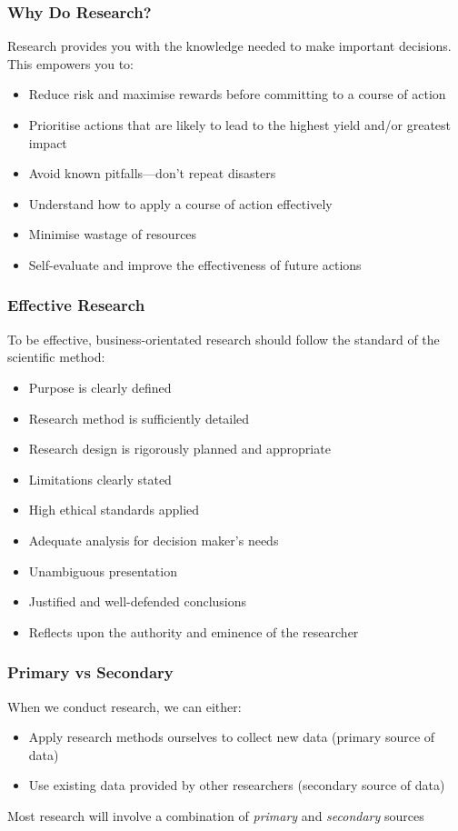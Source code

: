 \begin{frame}
	\frametitle{Why Do Research?}
	
	Research provides you with the knowledge needed to make important decisions. This empowers you to:
	
	\begin{itemize}
		\item Reduce risk and maximise rewards before committing to a course of action
		\item Prioritise actions that are likely to lead to the highest yield and/or greatest impact
		\item Avoid known pitfalls---don't repeat disasters
		\item Understand how to apply a course of action effectively
		\item Minimise wastage of resources
		\item Self-evaluate and improve the effectiveness of future actions
	\end{itemize}
\end{frame}

\begin{frame}
	\frametitle{Effective Research}
	
	To be effective, business-orientated research should follow the standard of the scientific method:
	
	\begin{itemize}
		\item Purpose is clearly defined
		\item Research method is sufficiently detailed
		\item Research design is rigorously planned and appropriate
		\item Limitations clearly stated
		\item High ethical standards applied
		\item Adequate analysis for decision maker's needs
		\item Unambiguous presentation
		\item Justified and well-defended conclusions
		\item Reflects upon the authority and eminence of the researcher
	\end{itemize}
\end{frame}

\begin{frame}
	\frametitle{Primary vs Secondary}
	
	When we conduct research, we can either:
	
	\begin{itemize}
		\item Apply research methods ourselves to collect new data (primary source of data)
		\item Use existing data provided by other researchers (secondary source of data)
	\end{itemize}
	
	Most research will involve a combination of \textit{primary} and \textit{secondary} sources
	
\end{frame}

